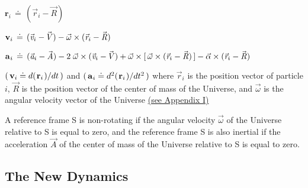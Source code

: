 \documentclass[10pt]{article}
\begin{document}
\par \bigskip\smallskip ${\mathbf{r}}_i \,\doteq\, ({\vec{\mathit{r}}}_i - {\vec{\mathit{R}}})$

\par \bigskip ${\mathbf{v}}_i \,\doteq\, ({\vec{\mathit{v}}}_i - \hspace{-0.120em}{\vec{\mathit{V}}}) - {\vec{\omega}} \times ({\vec{\mathit{r}}}_i - {\vec{\mathit{R}}})$

\par \bigskip ${\mathbf{a}}_{\hspace{+0.045em}i} \,\doteq\, ({\vec{\mathit{a}}}_i - {\vec{\mathit{A}}}) - 2 \; {\vec{\omega}} \times ({\vec{\mathit{v}}}_i - \hspace{-0.120em}{\vec{\mathit{V}}}) + {\vec{\omega}} \times [ \, {\vec{\omega}} \times ({\vec{\mathit{r}}}_i - {\vec{\mathit{R}}}) \, ] - {\vec{\alpha}} \times ({\vec{\mathit{r}}}_i - {\vec{\mathit{R}}})$

\par \bigskip\smallskip \noindent $( \, {\mathbf{v}}_i \doteq d(\hspace{+0.090em}{\mathbf{r}}_i\hspace{+0.090em})/dt \, )$ and $( \, {\mathbf{a}}_{\hspace{+0.045em}i} \doteq d^2(\hspace{+0.090em}{\mathbf{r}}_i\hspace{+0.090em})/dt^2 \, )$ where ${\vec{\mathit{r}}}_i$ is the position vector of particle $i$, ${\vec{\mathit{R}}}$ is the position vector of the center of mass of the Universe, and ${\vec{\omega}}$ is the angular velocity vector of the Universe \hyperlink{p1a1}{(\hspace{+0.120em}see Appendix I\hspace{+0.120em})}

\par \bigskip \noindent A reference frame S is non-rotating if the angular velocity ${\vec{\omega}}$ of the Universe relative to S is equal to zero, and the reference frame S is also inertial if the acceleration ${\vec{\mathit{A}}}$ of the center of mass of the Universe relative to S is equal to zero.

\vspace{+1.20em}

\par {\centering\subsection*{The New Dynamics}}
\end{document}
